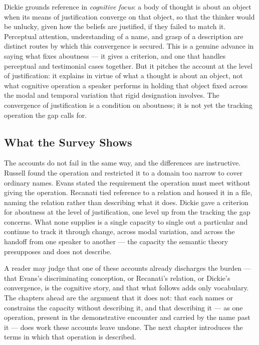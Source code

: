 \documentclass[12pt,a4paper]{article}
\begin{document}
Dickie grounds reference in \emph{cognitive focus}: a body of thought is about an object when its means of justification converge on that object, so that the thinker would be unlucky, given how the beliefs are justified, if they failed to match it. Perceptual attention, understanding of a name, and grasp of a description are distinct routes by which this convergence is secured. This is a genuine advance in saying what fixes aboutness --- it gives a criterion, and one that handles perceptual and testimonial cases together. But it pitches the account at the level of justification: it explains in virtue of what a thought is about an object, not what cognitive operation a speaker performs in holding that object fixed across the modal and temporal variation that rigid designation involves. The convergence of justification is a condition on aboutness; it is not yet the tracking operation the gap calls for.

\subsection{What the Survey Shows}\label{what-the-survey-shows}

The accounts do not fail in the same way, and the differences are instructive. Russell found the operation and restricted it to a domain too narrow to cover ordinary names. Evans stated the requirement the operation must meet without giving the operation. Recanati tied reference to a relation and housed it in a file, naming the relation rather than describing what it does. Dickie gave a criterion for aboutness at the level of justification, one level up from the tracking the gap concerns. What none supplies is a single capacity to single out a particular and continue to track it through change, across modal variation, and across the handoff from one speaker to another --- the capacity the semantic theory presupposes and does not describe.

A reader may judge that one of these accounts already discharges the burden --- that Evans's discriminating conception, or Recanati's relation, or Dickie's convergence, is the cognitive story, and that what follows adds only vocabulary. The chapters ahead are the argument that it does not: that each names or constrains the capacity without describing it, and that describing it --- as one operation, present in the demonstrative encounter and carried by the name past it --- does work these accounts leave undone. The next chapter introduces the terms in which that operation is described.
\end{document}
